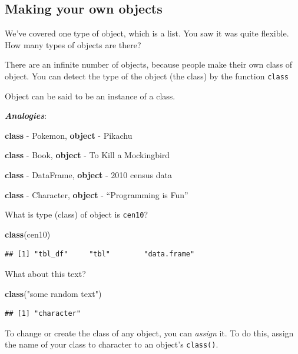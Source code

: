 \documentclass[]{book}
\newenvironment{Shaded}{\begin{snugshade}}{\end{snugshade}}
\newcommand{\KeywordTok}[1]{\textcolor[rgb]{0.13,0.29,0.53}{\textbf{#1}}}
\newcommand{\NormalTok}[1]{#1}
\newcommand{\StringTok}[1]{\textcolor[rgb]{0.31,0.60,0.02}{#1}}
\theoremstyle{definition}
\theoremstyle{definition}
\theoremstyle{definition}
\theoremstyle{remark}
\begin{document}
\begin{Shaded}
\begin{Highlighting}[]
\begin{Shaded}
\begin{Highlighting}[]
\begin{Shaded}
\begin{Highlighting}[]
\hypertarget{making-your-own-objects}{%
\section{Making your own objects}\label{making-your-own-objects}}

We've covered one type of object, which is a list. You saw it was quite flexible. How many types of objects are there?

There are an infinite number of objects, because people make their own class of object. You can detect the type of the object (the class) by the function \texttt{class}

Object can be said to be an instance of a class.

\textbf{\emph{Analogies}}:

\textbf{class} - Pokemon, \textbf{object} - Pikachu

\textbf{class} - Book, \textbf{object} - To Kill a Mockingbird

\textbf{class} - DataFrame, \textbf{object} - 2010 census data

\textbf{class} - Character, \textbf{object} - ``Programming is Fun''

What is type (class) of object is \texttt{cen10}?

\begin{Shaded}
\begin{Highlighting}[]
\KeywordTok{class}\NormalTok{(cen10)}
\end{Highlighting}
\end{Shaded}

\begin{verbatim}
## [1] "tbl_df"     "tbl"        "data.frame"
\end{verbatim}

What about this text?

\begin{Shaded}
\begin{Highlighting}[]
\KeywordTok{class}\NormalTok{(}\StringTok{"some random text"}\NormalTok{)}
\end{Highlighting}
\end{Shaded}

\begin{verbatim}
## [1] "character"
\end{verbatim}

To change or create the class of any object, you can \emph{assign} it. To do this, assign the name of your class to character to an object's \texttt{class()}.


\end{Highlighting}
\end{Shaded}
\end{Highlighting}
\end{Shaded}
\end{Highlighting}
\end{Shaded}
\end{document}
